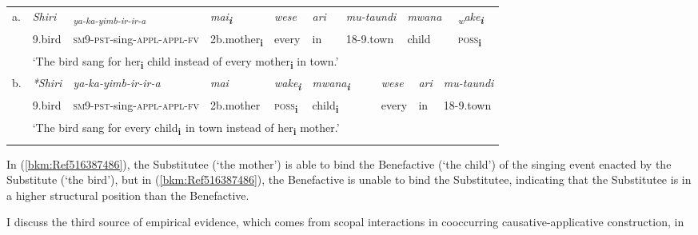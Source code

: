 \documentclass[output=paper,modfonts,nonflat]{langsci/langscibook}
\begin{document}
\tabletail{}
\tablelasttail{}
\begin{tabularx}{\textwidth}{XXXXXXXXXXXX}
\lsptoprule
a. & \textit{Shiri} & \textit{\textsubscript{ya-ka-yimb-ir-ir-a} } & \textit{mai}\textbf{\textit{\textsubscript{i}}} & \textit{wese} & \textit{ari} & \multicolumn{2}{X}{\textit{mu-taundi}} & \multicolumn{3}{X}{\textit{mwana}} & \textit{\textsubscript{w}}\textit{ake}\textbf{\textit{\textsubscript{i}}}\\
& 9.bird & \textsc{sm}9-\textsc{pst}{}-sing-\textsc{appl-appl-fv} & 2b.mother\textbf{\textsubscript{i}} & every & in & \multicolumn{2}{X}{18-9.town} & \multicolumn{3}{X}{child} & \textsc{poss}\textbf{\textsubscript{i}}\\
& \multicolumn{7}{X}{‘The bird sang for her\textbf{\textsubscript{i}} child instead of every mother\textbf{\textsubscript{i}} in town.’} & \multicolumn{3}{X}{} & \\
b. & {\itshape \textup{*}Shiri} & {\itshape  ya-ka-yimb-ir-ir-a} & {\itshape mai} & {\itshape wake\textbf{\textsubscript{i}}} & \multicolumn{2}{X}{{\itshape mwana\textbf{\textsubscript{i}}}} & \multicolumn{2}{X}{{\itshape wese}} & {\itshape ari} & \multicolumn{2}{X}{{\itshape mu-taundi}}\\
& 9.bird & \textsc{sm}9-\textsc{pst}{}-sing-\textsc{appl-appl-fv} & 2b.mother & \textsc{poss}\textbf{\textsubscript{i}} & \multicolumn{2}{X}{child\textbf{\textsubscript{i}}} & \multicolumn{2}{X}{every} & in & \multicolumn{2}{X}{18-9.town}\\
& \multicolumn{11}{X}{‘The bird sang for every child\textbf{\textsubscript{i}}\textsubscript{~}in town instead of her\textbf{\textsubscript{i}}\textsubscript{} mother.’}\\
\lspbottomrule
\end{tabularx}
\begin{styleDefault}
In (\ref{bkm:Ref516387486}), the Substitutee (‘the mother’) is able to bind the Benefactive (‘the child’) of the singing event enacted by the Substitute (‘the bird’), but in (\ref{bkm:Ref516387486}), the Benefactive is unable to bind the Substitutee, indicating that the Substitutee is in a higher structural position than the Benefactive. 
\end{styleDefault}

\begin{styleDefault}
I discuss the third source of empirical evidence, which comes from scopal interactions in cooccurring causative-applicative construction, in 
\end{styleDefault}
\end{document}
